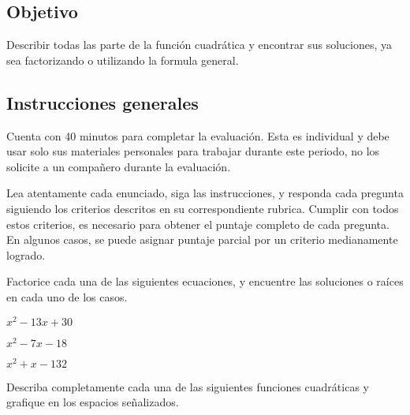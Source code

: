 \documentclass[]{srs}
\begin{document}
\subsection*{Objetivo}
  Describir todas las parte de la función cuadrática y encontrar sus soluciones, ya sea
  factorizando o utilizando la formula general.

\subsection*{Instrucciones generales}
  Cuenta con 40 minutos para completar la evaluación. Esta es individual y debe usar solo
  sus materiales personales para trabajar durante este periodo, no los solicite a un compañero
  durante la evaluación.

  Lea atentamente cada enunciado, siga las instrucciones, y responda cada
  pregunta siguiendo los criterios descritos en su correspondiente rubrica. Cumplir
  con todos estos criterios, es necesario para obtener el puntaje completo de cada pregunta.
  En algunos casos, se puede asignar puntaje parcial por un criterio medianamente logrado.

\separador[2mm]

Factorice cada una de las siguientes ecuaciones, y encuentre las soluciones o raíces
en cada uno de los casos.

\begin{preguntas}
  \pregunta $x^2 -13x+30$
  \begin{malla}[7]

  \end{malla}
  \usebox{\rubricaUno}
  \pregunta $x^2-7x-18$
  \begin{malla}[7]

  \end{malla}
  \usebox{\rubricaUno}
  \pregunta $x^2+x-132$
  \begin{malla}[7]

  \end{malla}
  \usebox{\rubricaUno}

\end{preguntas}

\newpage
Describa completamente cada una de las siguientes funciones cuadráticas y grafique
en los espacios señalizados.
\end{document}
